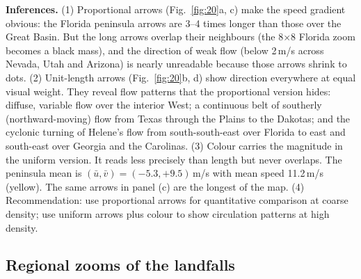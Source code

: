 \textbf{Inferences.}
(1) Proportional arrows (Fig.~\ref{fig:20}a, c) make the speed gradient obvious: the Florida peninsula arrows are 3--4 times
longer than those over the Great Basin. But the long arrows overlap their neighbours (the 8$\times$8 Florida zoom becomes a
black mass), and the direction of weak flow (below 2\,m/s across Nevada, Utah and Arizona) is nearly unreadable because
those arrows shrink to dots.
(2) Unit-length arrows (Fig.~\ref{fig:20}b, d) show direction everywhere at equal visual weight. They reveal flow
patterns that the proportional version hides: diffuse, variable flow over the interior West; a continuous belt of
southerly (northward-moving) flow from Texas through the Plains to the Dakotas; and the cyclonic turning of Helene's flow
from south-south-east over Florida to east and south-east over Georgia and the Carolinas.
(3) Colour carries the magnitude in the uniform version. It reads less precisely than length but never overlaps. The
peninsula mean is $(\bar u,\bar v)=(-5.3,+9.5)$\,m/s with mean speed 11.2\,m/s (yellow). The same arrows in panel (c) are
the longest of the map.
(4) Recommendation: use proportional arrows for quantitative comparison at coarse density; use uniform arrows plus colour
to show circulation patterns at high density.

\subsection{Regional zooms of the landfalls}


